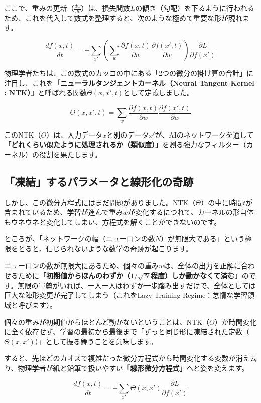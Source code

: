 ここで、重みの更新（\(\frac{dw}{dt}\)）は、損失関数\(L\)の傾き（勾配）を下るように行われるため、これを代入して数式を整理すると、次のような極めて重要な形が現れます。

\[\frac{df(x, t)}{dt} = - \sum_{x'} \left( \sum_{w} \frac{\partial f(x, t)}{\partial w} \frac{\partial f(x', t)}{\partial w} \right) \frac{\partial L}{\partial f(x')}\]

物理学者たちは、この数式のカッコの中にある「2つの微分の掛け算の合計」に注目し、これを\textbf{「ニューラルタンジェントカーネル（Neural Tangent Kernel : NTK）」}と呼ばれる関数\(\Theta(x, x', t)\)として定義しました。

\[\Theta(x, x', t) = \sum_{w} \frac{\partial f(x, t)}{\partial w} \frac{\partial f(x', t)}{\partial w}\]

このNTK（\(\Theta\)）は、入力データ\(x\)と別のデータ\(x'\)が、AIのネットワークを通して\textbf{「どれくらい似たように処理されるか（類似度）」}を測る強力なフィルター（カーネル）の役割を果たします。

\subsection{「凍結」するパラメータと線形化の奇跡}

しかし、この微分方程式にはまだ問題がありました。NTK（\(\Theta\)）の中に時間\(t\)が含まれているため、学習が進んで重み\(w\)が変化するにつれて、カーネルの形自体もウネウネと変化してしまい、方程式を解くことができないのです。

ところが、「ネットワークの幅（ニューロンの数\(N\)）が無限大である」という極限をとると、信じられないような数学の奇跡が起こります。

ニューロンの数が無限大にあるため、個々の重み\(w\)は、全体の出力を正解に合わせるために\textbf{「初期値からほんのわずか（\(1/\sqrt{N}\)程度）しか動かなくて済む」}のです。無限の軍勢がいれば、一人一人はわずか一歩踏み出すだけで、全体としては巨大な陣形変更が完了してしまう（これをLazy Training Regime：怠惰な学習領域と呼びます）。

個々の重みが初期値からほとんど動かないということは、NTK（\(\Theta\)）が時間変化に全く依存せず、学習の最初から最後まで「ずっと同じ形に凍結された定数（\(\Theta(x, x')\)）」として振る舞うことを意味します。

すると、先ほどのカオスで複雑だった微分方程式から時間変化する変数が消え去り、物理学者が紙と鉛筆で扱いやすい\textbf{「線形微分方程式」}へと姿を変えます。

\[\frac{df(x, t)}{dt} = - \sum_{x'} \Theta(x, x') \frac{\partial L}{\partial f(x')}\]

